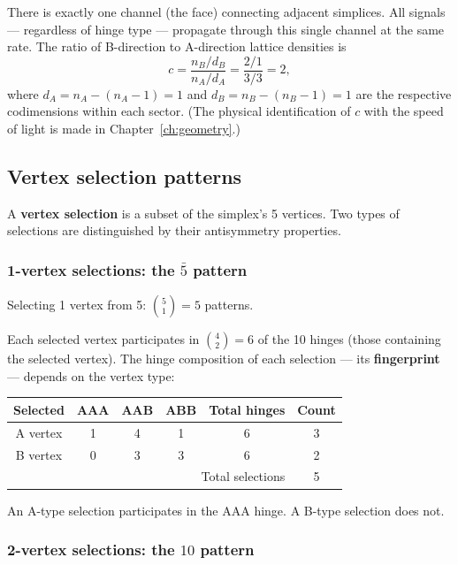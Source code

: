 There is exactly one channel (the face) connecting adjacent simplices. All signals --- regardless of hinge type --- propagate through this single channel at the same rate. The ratio of B-direction to A-direction lattice densities is
\begin{equation}
c = \frac{n_B / d_B}{n_A / d_A} = \frac{2/1}{3/3} = 2,
\label{eq:c_geometric}
\end{equation}
where $d_A = n_A - (n_A - 1) = 1$ and $d_B = n_B - (n_B - 1) = 1$ are the respective codimensions within each sector. (The physical identification of $c$ with the speed of light is made in Chapter~\ref{ch:geometry}.)

\subsection{Vertex selection patterns}
\label{sec:fermion_combinatorics}

A \textbf{vertex selection} is a subset of the simplex's 5 vertices. Two types of selections are distinguished by their antisymmetry properties.

\subsubsection{1-vertex selections: the $\bar{5}$ pattern}

Selecting 1 vertex from 5: $\binom{5}{1} = 5$ patterns.

Each selected vertex participates in $\binom{4}{2} = 6$ of the 10 hinges (those containing the selected vertex). The hinge composition of each selection --- its \textbf{fingerprint} --- depends on the vertex type:

\begin{center}
\begin{tabular}{cccccc}
\hline
Selected & AAA & AAB & ABB & Total hinges & Count \\
\hline
A vertex & 1 & 4 & 1 & 6 & 3 \\
B vertex & 0 & 3 & 3 & 6 & 2 \\
\hline
\multicolumn{5}{r}{Total selections} & 5 \\
\hline
\end{tabular}
\end{center}

An A-type selection participates in the AAA hinge. A B-type selection does not.

\subsubsection{2-vertex selections: the $10$ pattern}

